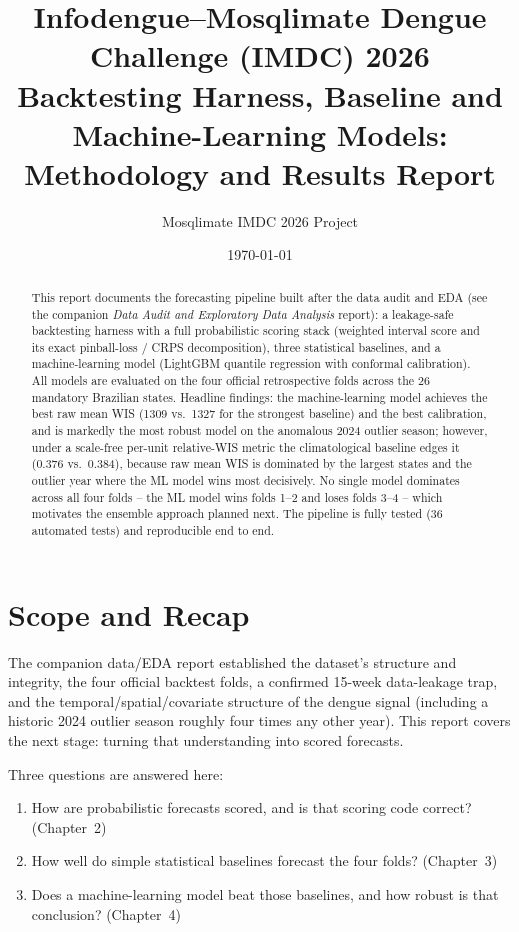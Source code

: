 \documentclass[11pt]{report}
\title{\textbf{Infodengue--Mosqlimate Dengue Challenge (IMDC) 2026\\[4pt]
\Large Backtesting Harness, Baseline and Machine-Learning Models:\\ Methodology and Results Report}}
\author{Mosqlimate IMDC 2026 Project}
\date{\today}
\begin{document}
\maketitle
\thispagestyle{empty}

\begin{abstract}
\noindent
This report documents the forecasting pipeline built after the data audit and EDA (see the companion \emph{Data Audit and Exploratory Data Analysis} report): a leakage-safe backtesting harness with a full probabilistic scoring stack (weighted interval score and its exact pinball-loss / CRPS decomposition), three statistical baselines, and a machine-learning model (LightGBM quantile regression with conformal calibration). All models are evaluated on the four official retrospective folds across the 26 mandatory Brazilian states. Headline findings: the machine-learning model achieves the best raw mean WIS (1309 vs.\ 1327 for the strongest baseline) and the best calibration, and is markedly the most robust model on the anomalous 2024 outlier season; however, under a scale-free per-unit relative-WIS metric the climatological baseline edges it (0.376 vs.\ 0.384), because raw mean WIS is dominated by the largest states and the outlier year where the ML model wins most decisively. No single model dominates across all four folds -- the ML model wins folds 1--2 and loses folds 3--4 -- which motivates the ensemble approach planned next. The pipeline is fully tested (36 automated tests) and reproducible end to end.
\end{abstract}

\tableofcontents

\chapter{Scope and Recap}

The companion data/EDA report established the dataset's structure and integrity, the four official backtest folds, a confirmed 15-week data-leakage trap, and the temporal/spatial/covariate structure of the dengue signal (including a historic 2024 outlier season roughly four times any other year). This report covers the next stage: turning that understanding into scored forecasts.

Three questions are answered here:
\begin{enumerate}
\item How are probabilistic forecasts scored, and is that scoring code correct? (Chapter~2)
\item How well do simple statistical baselines forecast the four folds? (Chapter~3)
\item Does a machine-learning model beat those baselines, and how robust is that conclusion? (Chapter~4)
\end{enumerate}
\end{document}
